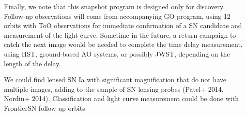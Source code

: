 Finally, we note that this snapshot program is designed only for
discovery. Follow-up observations will come from accompanying GO
program, using 12 orbits with ToO observations for immediate
confirmation of a SN candidate and measurement of the light curve.
Sometime in the future, a return campaign to catch the next image
would be needed to complete the time delay measurement, using HST,
ground-based AO systems, or possibly JWST, depending on the length of
the delay.


\medskip
{} 
We could find lensed SN Ia with significant magnification that do not
have multiple images, adding to the sample of SN lensing probes
(Patel+ 2014, Nordin+ 2014).  Classification and light curve
measurement could be done with FrontierSN follow-up orbits










